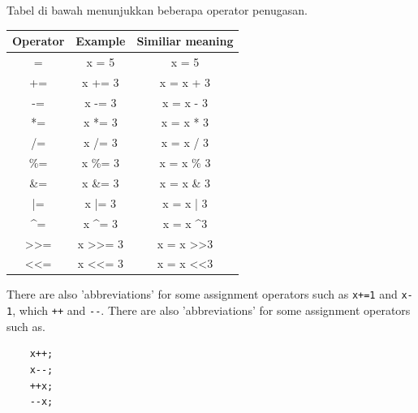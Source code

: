Tabel di bawah menunjukkan beberapa operator penugasan.
\begin{center}
	\begin{tabular}{|c|c|c|}
		\hline
		\multicolumn{1}{|l|}{Operator} & \multicolumn{1}{l|}{Example}       & \multicolumn{1}{l|}{Similiar meaning}  \\ \hline
		=   & x = 5   & x = 5      \\ \hline
		+=  & x += 3  & x = x + 3  \\ \hline
		-=  & x -= 3  & x = x - 3  \\ \hline
		*=  & x *= 3  & x = x * 3  \\ \hline
		/=  & x /= 3  & x = x / 3  \\ \hline
		\%= & x \%= 3 & x = x \% 3 \\ \hline
		\&= & x \&= 3 & x = x \& 3 \\ \hline
		|=  & x |= 3  & x = x | 3  \\ \hline
		\textasciicircum{}=            & x \textasciicircum{}= 3           & x = x \textasciicircum 3           \\ \hline
		\textgreater{}\textgreater{}=  & x \textgreater{}\textgreater{}= 3 & x = x \textgreater{}\textgreater 3 \\ \hline
		\textless{}\textless{}=        & x \textless{}\textless{}= 3       & x = x \textless{}\textless 3       \\ \hline
	\end{tabular}
\end{center}
There are also 'abbreviations' for some assignment operators such as \verb*|x+=1| and \verb*|x-1|, which \verb*|++| and \verb*|--|. There are also 'abbreviations' for some assignment operators such as.
\begin{verbatim}
    x++;
    x--;
    ++x;
    --x;
\end{verbatim}

